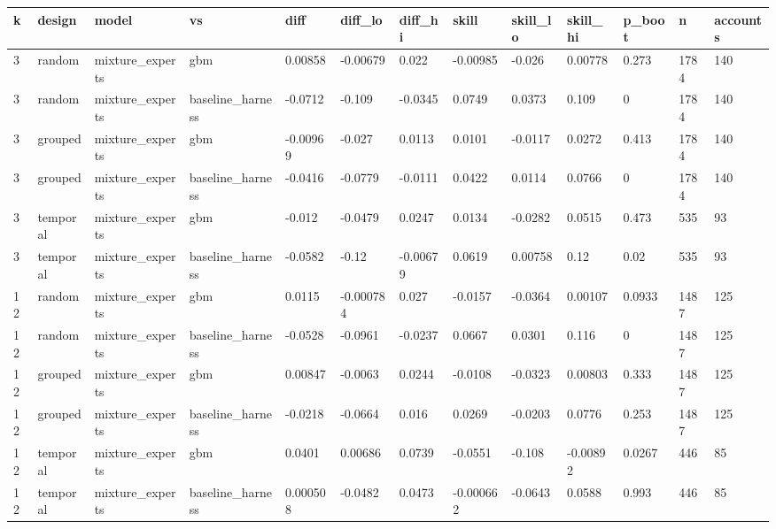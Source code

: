 \begin{tabular}{lllllllllllll}
\toprule
k & design & model & vs & diff & diff\_lo & diff\_hi & skill & skill\_lo & skill\_hi & p\_boot & n & accounts \\
\midrule
3 & random & mixture\_experts & gbm & 0.00858 & -0.00679 & 0.022 & -0.00985 & -0.026 & 0.00778 & 0.273 & 1784 & 140 \\
3 & random & mixture\_experts & baseline\_harness & -0.0712 & -0.109 & -0.0345 & 0.0749 & 0.0373 & 0.109 & 0 & 1784 & 140 \\
3 & grouped & mixture\_experts & gbm & -0.00969 & -0.027 & 0.0113 & 0.0101 & -0.0117 & 0.0272 & 0.413 & 1784 & 140 \\
3 & grouped & mixture\_experts & baseline\_harness & -0.0416 & -0.0779 & -0.0111 & 0.0422 & 0.0114 & 0.0766 & 0 & 1784 & 140 \\
3 & temporal & mixture\_experts & gbm & -0.012 & -0.0479 & 0.0247 & 0.0134 & -0.0282 & 0.0515 & 0.473 & 535 & 93 \\
3 & temporal & mixture\_experts & baseline\_harness & -0.0582 & -0.12 & -0.00679 & 0.0619 & 0.00758 & 0.12 & 0.02 & 535 & 93 \\
12 & random & mixture\_experts & gbm & 0.0115 & -0.000784 & 0.027 & -0.0157 & -0.0364 & 0.00107 & 0.0933 & 1487 & 125 \\
12 & random & mixture\_experts & baseline\_harness & -0.0528 & -0.0961 & -0.0237 & 0.0667 & 0.0301 & 0.116 & 0 & 1487 & 125 \\
12 & grouped & mixture\_experts & gbm & 0.00847 & -0.0063 & 0.0244 & -0.0108 & -0.0323 & 0.00803 & 0.333 & 1487 & 125 \\
12 & grouped & mixture\_experts & baseline\_harness & -0.0218 & -0.0664 & 0.016 & 0.0269 & -0.0203 & 0.0776 & 0.253 & 1487 & 125 \\
12 & temporal & mixture\_experts & gbm & 0.0401 & 0.00686 & 0.0739 & -0.0551 & -0.108 & -0.00892 & 0.0267 & 446 & 85 \\
12 & temporal & mixture\_experts & baseline\_harness & 0.000508 & -0.0482 & 0.0473 & -0.000662 & -0.0643 & 0.0588 & 0.993 & 446 & 85 \\
\bottomrule
\end{tabular}